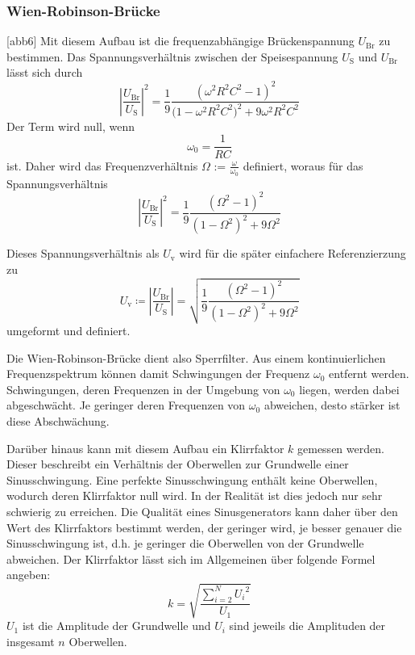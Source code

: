 \subsubsection{Wien-Robinson-Brücke}
\label{sec:wien}
[abb6]
Mit diesem Aufbau ist die frequenzabhängige Brückenspannung $U_{\text{Br}}$ zu bestimmen. Das Spannungsverhältnis
zwischen der Speisespannung $U_{\text{S}}$ und $U_{\text{Br}}$ lässt sich durch \begin{equation}
    \left|\frac{U_{\text{Br}}}{U_{\text{S}}}\right|^2 = \frac{1}{9}\frac{(\omega^2 R^2 C^2 -1)^2}{\bigl (1- \omega^2 R^2 C^2\bigr)^2 + 9\omega^2 R^2 C^2} 	
\end{equation}
Der Term wird null, wenn \begin{equation}
    \omega_0 = \frac{1}{RC}
\end{equation} ist. Daher wird das Frequenzverhältnis $\Omega$ := $\frac{\omega}{\omega_0}$ definiert, woraus für das
Spannungsverhältnis \begin{equation}
\label{eqn:u}
    \left|\frac{U_{\text{Br}}}{U_{\text{S}}}\right|^2 = \frac{1}{9}\frac{(\Omega^2 -1)^2}{(1- \Omega^2)^2 + 9\Omega^2}
\end{equation}

Dieses Spannungsverhältnis als $U_{\text{v}}$ wird für die später einfachere Referenzierzung zu
\begin{equation}
   U_{\text{v}}\coloneq \left|\frac{U_{\text{Br}}}{U_{\text{S}}}\right| = \sqrt{\frac{1}{9}\frac{(\Omega^2 -1)^2}{(1- \Omega^2)^2 + 9\Omega^2}}
\end{equation}
umgeformt und definiert.


Die Wien-Robinson-Brücke dient also Sperrfilter. Aus einem kontinuierlichen Frequenzspektrum können damit 
Schwingungen der Frequenz $\omega_0$ entfernt werden. Schwingungen, deren Frequenzen in der Umgebung von 
$\omega_0$ liegen, werden dabei abgeschwächt. Je geringer deren Frequenzen von $\omega_0$ abweichen, desto 
stärker ist diese Abschwächung. 

Darüber hinaus kann mit diesem Aufbau ein Klirrfaktor $k$ gemessen werden. Dieser beschreibt ein Verhältnis der 
Oberwellen zur Grundwelle einer Sinusschwingung. Eine perfekte Sinusschwingung enthält keine Oberwellen, wodurch deren 
Klirrfaktor null wird. In der Realität ist dies jedoch nur sehr schwierig zu erreichen. Die Qualität eines Sinusgenerators
kann daher über den Wert des Klirrfaktors bestimmt werden, der geringer wird, je besser genauer die Sinusschwingung ist, 
d.h. je geringer die Oberwellen von der Grundwelle abweichen. Der Klirrfaktor lässt sich im Allgemeinen über folgende
Formel angeben: \begin{equation}
    \label{eqn:k}
    k = \sqrt{\frac{\sum_{i=2}^N {U_i}^2}{U_1}}
\end{equation}
$U_1$ ist die Amplitude der Grundwelle und $U_i$ sind jeweils die Amplituden der insgesamt $n$ Oberwellen.






